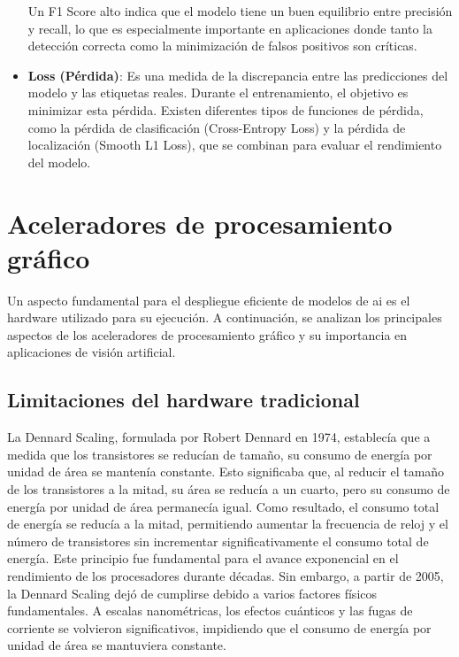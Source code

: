 \documentclass[11pt,spanish,listoffigures,listoftables]{tfgetsinf}
\begin{document}
\begin{itemize}
   Un F1 Score alto indica que el modelo tiene un buen equilibrio entre precisión y recall, lo que es especialmente importante en aplicaciones donde tanto la detección correcta como la minimización de falsos positivos son críticas.

   \item \textbf{Loss (Pérdida)}: Es una medida de la discrepancia entre las predicciones del modelo y las etiquetas reales. Durante el entrenamiento, el objetivo es minimizar esta pérdida. Existen diferentes tipos de funciones de pérdida, como la pérdida de clasificación (Cross-Entropy Loss) y la pérdida de localización (Smooth L1 Loss), que se combinan para evaluar el rendimiento del modelo.

\end{itemize}


\section{Aceleradores de procesamiento gráfico} \label{sec:hardware}
Un aspecto fundamental para el despliegue eficiente de modelos de \gls{ai} es el hardware utilizado para su ejecución. A continuación, se analizan los principales aspectos de los aceleradores de procesamiento gráfico y su importancia en aplicaciones de visión artificial.

\subsection{Limitaciones del hardware tradicional} \label{sec:limitaciones_hardware}

La Dennard Scaling\cite{dennard1974design}, formulada por Robert Dennard en 1974, establecía que a medida que los transistores se reducían de tamaño, su consumo de energía por unidad de área se mantenía constante. Esto significaba que, al reducir el tamaño de los transistores a la mitad, su área se reducía a un cuarto, pero su consumo de energía por unidad de área permanecía igual. Como resultado, el consumo total de energía se reducía a la mitad, permitiendo aumentar la frecuencia de reloj y el número de transistores sin incrementar significativamente el consumo total de energía. Este principio fue fundamental para el avance exponencial en el rendimiento de los procesadores durante décadas. Sin embargo, a partir de 2005, la Dennard Scaling dejó de cumplirse debido a varios factores físicos fundamentales. A escalas nanométricas, los efectos cuánticos y las fugas de corriente se volvieron significativos, impidiendo que el consumo de energía por unidad de área se mantuviera constante.
\end{document}

